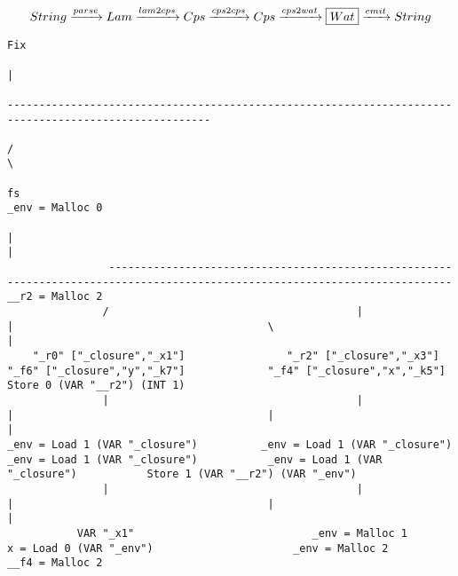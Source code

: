 \begin{landscape}
\begin{gather*}
  String \xrightarrow{parse} Lam \xrightarrow{lam2cps} Cps \xrightarrow{cps2cps} Cps \xrightarrow{cps2wat} \boxed{Wat} \xrightarrow{emit} String
\end{gather*}

\begin{lstlisting}[basicstyle=\fontsize{6}{7.5}\selectfont\ttfamily]
                                                                                                    Fix
                                                                                                     |
                                                                                ------------------------------------------------------------------------------------------------------
                                                                               /                                                                                                      \
                                                                               fs                                                                                              _env = Malloc 0
                                                                               |                                                                                                      |
                ----------------------------------------------------------------------------------------------------------------------------                                   __r2 = Malloc 2
               /                                       |                                           |                                        \                                         |
    "_r0" ["_closure","_x1"]                "_r2" ["_closure","_x3"]                  "_f6" ["_closure","y","_k7"]             "_f4" ["_closure","x","_k5"]              Store 0 (VAR "__r2") (INT 1)
               |                                       |                                           |                                        |                                         |
_env = Load 1 (VAR "_closure")          _env = Load 1 (VAR "_closure")              _env = Load 1 (VAR "_closure")           _env = Load 1 (VAR "_closure")           Store 1 (VAR "__r2") (VAR "_env")
               |                                       |                                           |                                        |                                         |
           VAR "_x1"                            _env = Malloc 1                         x = Load 0 (VAR "_env")                      _env = Malloc 2                           __f4 = Malloc 2

\end{lstlisting}
\end{landscape}
